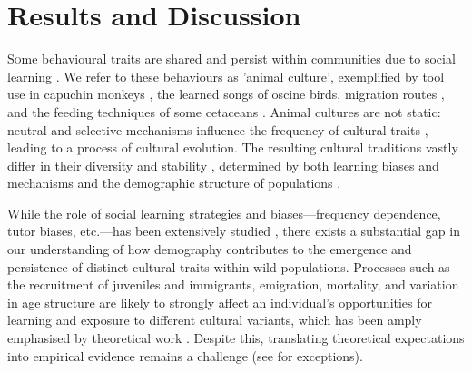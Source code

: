 \documentclass[9pt, twocolumn, twoside]{gsajnl}
\begin{document}


\maketitle
\vspace{-13pt}%

\section{Results and Discussion}

\lettrine[lines=2]Some behavioural traits are shared and persist within communities due to social learning \parencite{viciana2021}. We refer to these behaviours as 'animal culture', exemplified by tool use in capuchin monkeys \parencite{falotico2019}, the learned songs of oscine birds, migration routes \parencite{jesmer2018, berdahl2018, byholm2022}, and the feeding techniques of some cetaceans \parencite{allen2013, rendell2001}. Animal cultures are not static: neutral and selective mechanisms influence the frequency of cultural traits \parencite{potvin2015, williams2021}, leading to a process of cultural evolution. The resulting cultural traditions vastly differ in their diversity and stability \parencite{tchernichovski2017}, determined by both learning biases and mechanisms and the demographic structure of populations \parencite{deffner2022a, kandler2017}. 

While the role of social learning strategies and biases---frequency dependence, tutor biases, etc.---has been extensively studied \parencite{pike2010, kendal2015, aplin2017, lachlan2018, tchernichovski2021}, there exists a substantial gap in our understanding of how demography contributes to the emergence and persistence of distinct cultural traits within wild populations. Processes such as the recruitment of juveniles and immigrants, emigration, mortality, and variation in age structure are likely to strongly affect an individual's opportunities for learning and exposure to different cultural variants, which has been amply emphasised by theoretical work \parencite{deffner2022a, deffner2022, kandler2023, fogarty2019, deffner2020, derex2016, kirby2021, nunn2009, barta2023}. Despite this, translating theoretical expectations into empirical evidence remains a challenge (see \cite{chimento2021, fayet2014} for exceptions). 
\end{document}
